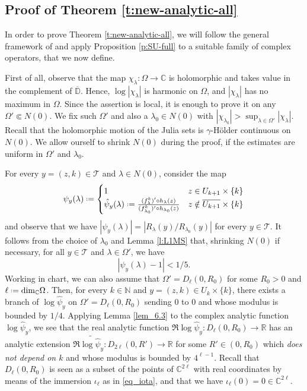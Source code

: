 \documentclass[11pt]{amsart}
\theoremstyle{plain}
\theoremstyle{definition}
\theoremstyle{remark}
\newcommand*{\defeq}{\mathrel{\vcenter{\baselineskip0.5ex \lineskiplimit0pt
			\hbox{\scriptsize.}\hbox{\scriptsize.}}}%
	=}
\begin{document}
\subsection{Proof of Theorem \ref{t:new-analytic-all}}
In order to prove
Theorem
\ref{t:new-analytic-all},
we will follow the general framework of \cite[Proof of Theorem A]{SU10}
and apply
Proposition \ref{p:SU-full} to a suitable family of complex
operators, that we now define.


First of all, 
observe that the map $\chi_\lambda\colon \Omega \to \mathbb C$ is holomorphic and 
takes value in the complement of  $\overline{\mathbb D}$.
Hence, $\log |\chi_\lambda|$ is harmonic on $\Omega$, and $|\chi_\lambda|$ has no maximum in $\Omega$. Since the assertion is local, it is enough to prove it on any $\Omega'\Subset N(0)$.
We fix such $\Omega'$ and also a $\lambda_0 \in N(0)$ with $|\chi_{\lambda_0}|> \sup_{\lambda \in \Omega'} |\chi_\lambda|$.
Recall that the holomorphic motion of the Julia sets is $\gamma$-H\"older
continuous on $N(0)$.
We allow ourself to shrink $N(0)$
during the proof, if the estimates are uniform in $\Omega'$ and $\lambda_0$.



For every $y = (z,k)
\in \mathcal T$
and $\lambda\in N(0)$, 
consider the map
$$\psi_y(\lambda) \defeq 
\begin{cases}
1 & z \in U_{k+1}\times\{k\}\\
\hat \psi_y (\lambda)
\defeq
\frac{(f^k_\lambda)' \circ h_\lambda(z)}{(f^k_{\lambda_0})'\circ h_{\lambda_0}(z)} 
& z \notin \overline{U_{k+1}}\times \{k\}
\end{cases}$$
and observe that we have 
$|\psi_y(\lambda)|= 
|R_\lambda (y)/R_{\lambda_0} (y)|$ for every $y \in \mathcal T$.
It follows from 
the choice of $\lambda_0$
and Lemma \ref{l:L1MS}
that,
shrinking $N(0)$
if necessary, for all $y \in \mathcal T$ 
and $\lambda\in \Omega'$, 
we have
$$|\psi_y(\lambda)-1|<1/5.$$
Working in chart, we can also assume that $\Omega'=
D_\ell (0,R_0)$ for some $R_0>0$ and $\ell \defeq {\rm dim}_{\mathbb C}\Omega$.
Then,
for every
$k\in \mathbb N$ and 
$y=(z,k) \in 
U_k\times \{k\}$,
there exists a branch of $\log \hat \psi_y$ on $\Omega'= D_\ell (0,R_0)$
sending 
$0$ to $0$ and whose modulus is bounded by $1/4$.
Applying Lemma \ref{lem_6.3} to the complex analytic function
$\log \hat \psi_y$, 
we see that the real analytic function
 $\Re\log \hat \psi_y \colon D_\ell (0,R_0) \to \mathbb{R}$ has an analytic extension $\Re \widetilde{\log \hat \psi_y} \colon D_{2\ell} (0,R') \to \mathbb{R}$ for some $R' \in (0,R_0)$
 which \emph{does not depend on $k$}
 and whose modulus is bounded by $4^{\ell-1}$. 
Recall that $D_\ell (0,R_0)$ is seen
as a subset of the points
of  
$\mathbb C^{2\ell}$
with real coordinates
by means of the immersion $\iota_\ell$ as in \eqref{eq_iota}, and that we have
$\iota_\ell (0)=0\in \mathbb C^{2\ell}$.
\end{document}
